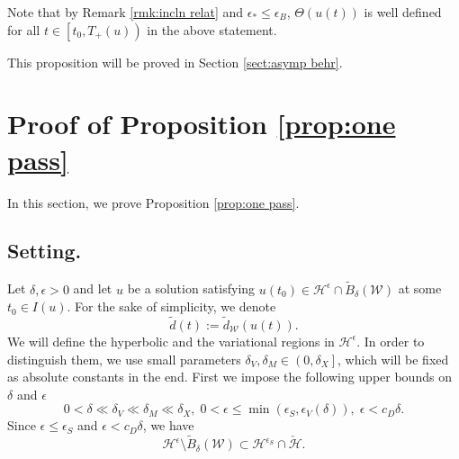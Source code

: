 \documentclass[reqno, 11pt]{amsart}
\numberwithin{equation}{section}
\theoremstyle{plain}
\theoremstyle{definition}
\numberwithin{equation}{section}
\numberwithin{theorem}{section}
\numberwithin{equation}{section}
\numberwithin{equation}{section}
\numberwithin{theorem}{section}
\begin{document}
	Note that by Remark \ref{rmk:incln relat} and $\epsilon_{*}\leq \epsilon_{B}$, $\Theta(u(t))$ is well defined for all $t\in\left[ t_0,T_{+}(u) \right)$ in the above statement.
	
	This proposition will be proved in Section \ref{sect:asymp behr}.
	
	
	\section{Proof of Proposition \ref{prop:one pass}}\label{sect:one pass}	
	In this section, we prove Proposition \ref{prop:one pass}.
	\subsection{Setting.} Let $\delta,\epsilon>0$ and let $u$ be a solution satisfying $u(t_0)\in \mathcal{H}^{\epsilon}\cap \widetilde{B}_{\delta}(\mathcal{W})$ at some $t_0\in I(u)$. For the sake of simplicity, we denote
	\begin{equation*}
	\widetilde{d}(t):=\widetilde{d}_{\mathcal{W}}(u(t)).
	\end{equation*}
	We will define the hyperbolic and the variational regions in $\mathcal{H}^{\epsilon}$. In order to distinguish them, we use small parameters $\delta_{V},\delta_{M}\in\left(0,\delta_{X}\right]$, which will be fixed as absolute constants in the end. First we impose the following upper bounds on $\delta$ and $\epsilon$
	\begin{equation}\label{dep small}
	0<\delta\ll \delta_{V}\ll \delta_{M}\ll \delta_{X},\; 0<\epsilon\leq \min(\epsilon_{S},\epsilon_{V}(\delta)),\; \epsilon<c_{D}\delta.
	\end{equation}
	Since $\epsilon\leq \epsilon_{S}$ and $\epsilon<c_{D}\delta$, we have
	\begin{equation*}
	\mathcal{H}^{\epsilon}\setminus \widetilde{B}_{\delta}(\mathcal{W})\subset \mathcal{H}^{\epsilon_S}\cap \check{\mathcal{H}}.
	\end{equation*}
	
\end{document}
